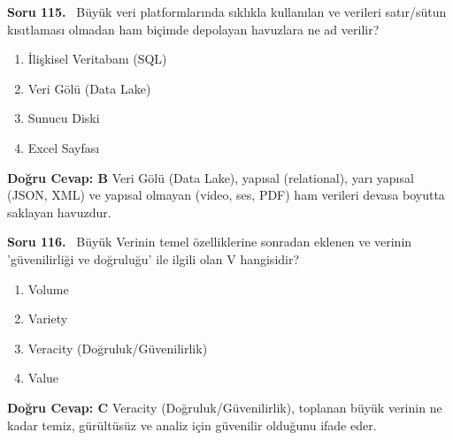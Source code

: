\documentclass[11pt,a4paper,openany]{book}
\begin{document}
\needspace{5cm}
\vspace{8pt}
\noindent\textbf{\large\sffamily Soru 115.} \ Büyük veri platformlarında sıklıkla kullanılan ve verileri satır/sütun kısıtlaması olmadan ham biçimde depolayan havuzlara ne ad verilir?
\begin{enumerate}[label=\Alph*), leftmargin=25pt, topsep=4pt, itemsep=2pt]
    \item İlişkisel Veritabanı (SQL)
    \item Veri Gölü (Data Lake)
    \item Sunucu Diski
    \item Excel Sayfası
\end{enumerate}
\vspace{4pt}
\begin{tcolorbox}[title=Cevap ve Açıklama, colback=gray!3!white, colframe=primarycolor!90!black, arc=2mm, fonttitle=\bfseries\sffamily, top=6pt, bottom=6pt]
    \textbf{Doğru Cevap: B}
    \vspace{2pt}
    Veri Gölü (Data Lake), yapısal (relational), yarı yapısal (JSON, XML) ve yapısal olmayan (video, ses, PDF) ham verileri devasa boyutta saklayan havuzdur.
\end{tcolorbox}
\vspace{10pt}

\needspace{5cm}
\vspace{8pt}
\noindent\textbf{\large\sffamily Soru 116.} \ Büyük Verinin temel özelliklerine sonradan eklenen ve verinin 'güvenilirliği ve doğruluğu' ile ilgili olan V hangisidir?
\begin{enumerate}[label=\Alph*), leftmargin=25pt, topsep=4pt, itemsep=2pt]
    \item Volume
    \item Variety
    \item Veracity (Doğruluk/Güvenilirlik)
    \item Value
\end{enumerate}
\vspace{4pt}
\begin{tcolorbox}[title=Cevap ve Açıklama, colback=gray!3!white, colframe=primarycolor!90!black, arc=2mm, fonttitle=\bfseries\sffamily, top=6pt, bottom=6pt]
    \textbf{Doğru Cevap: C}
    \vspace{2pt}
    Veracity (Doğruluk/Güvenilirlik), toplanan büyük verinin ne kadar temiz, gürültüsüz ve analiz için güvenilir olduğunu ifade eder.
\end{tcolorbox}
\vspace{10pt}
\end{document}
